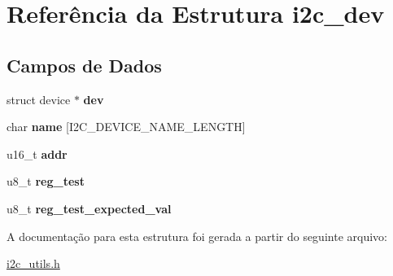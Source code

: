 \hypertarget{structi2c__dev}{}\section{Referência da Estrutura i2c\+\_\+dev}
\label{structi2c__dev}
\subsection*{Campos de Dados}
\begin{DoxyCompactItemize}
\item 
struct device $\ast$ {\bfseries dev}\hypertarget{structi2c__dev_ac4b6ba60143ff90df0ddc847deed7499}{}\label{structi2c__dev_ac4b6ba60143ff90df0ddc847deed7499}

\item 
char {\bfseries name} \mbox{[}I2\+C\+\_\+\+D\+E\+V\+I\+C\+E\+\_\+\+N\+A\+M\+E\+\_\+\+L\+E\+N\+G\+TH\mbox{]}\hypertarget{structi2c__dev_aa3e3ecd39bec0681b174122b4a5e91e5}{}\label{structi2c__dev_aa3e3ecd39bec0681b174122b4a5e91e5}

\item 
u16\+\_\+t {\bfseries addr}\hypertarget{structi2c__dev_ae9308c72bfb06fea21da16f47b4e679b}{}\label{structi2c__dev_ae9308c72bfb06fea21da16f47b4e679b}

\item 
u8\+\_\+t {\bfseries reg\+\_\+test}\hypertarget{structi2c__dev_a20bd6a8e30216a5866cfc70fec9a3203}{}\label{structi2c__dev_a20bd6a8e30216a5866cfc70fec9a3203}

\item 
u8\+\_\+t {\bfseries reg\+\_\+test\+\_\+expected\+\_\+val}\hypertarget{structi2c__dev_a46e0fffcf23e10012b1f5afc774088e7}{}\label{structi2c__dev_a46e0fffcf23e10012b1f5afc774088e7}

\end{DoxyCompactItemize}


A documentação para esta estrutura foi gerada a partir do seguinte arquivo\+:\begin{DoxyCompactItemize}
\item 
\hyperlink{i2c__utils_8h}{i2c\+\_\+utils.\+h}\end{DoxyCompactItemize}
